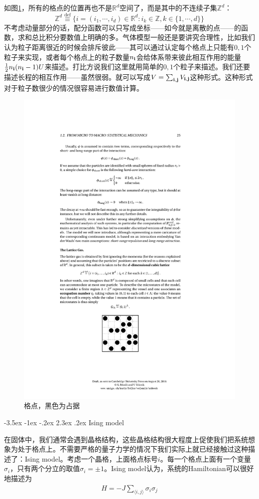 \documentclass[12pt,openany]{book}
\makeatletter
\renewcommand\section{\@startsection {section}{1}{\z@}%
                                   {-3.5ex \@plus -1ex \@minus -.2ex}%
                                   {2.3ex \@plus.2ex}%
                                   {\normalfont\large\bfseries}}
\makeatother
\begin{document}
如图\ref{Fig1}，所有的格点的位置再也不是$\mathbb{R}^d$空间了，而是其中的不连续子集$\mathbb{Z}^d$：
\[\mathbb{Z}^d\overset{\text{def}}{\equiv}\{i=(i_1,\cdots,i_d)\in\mathbb{R}^d: i_k\in\mathbb{Z}, k\in\{1,\cdots,d\}\} \]
不考虑动量部分的话，配分函数可以只写成坐标——如今就是离散的点——的函数，求和总比积分要数值上明确的多。气体模型一般还是要讲究合理性，比如我们认为粒子距离很近的时候会排斥彼此——其可以通过认定每个格点上只能有$0, 1$个粒子来实现，或者每个格点上的粒子数量$n_{\bf i}$会给体系带来彼此相互作用的能量$\frac{1}{2}n_{\bf i}(n_{\bf i}-1)U$来描述。打比方说我们这里就用简单的$0, 1$个粒子来描述。我们还要描述长程的相互作用——虽然很弱。就可以写成$V=\sum_{\bf i, j}V_{\bf i, j}$这种形式。这种形式对于粒子数很少的情况很容易进行数值计算。

\begin{figure}\centering
\includegraphics[width = .3\textwidth]{Fig1.pdf}
\caption{格点，黑色为占据}\label{Fig1}
\end{figure}



\section{Ising model}

在固体中，我们通常会遇到晶格结构，这些晶格结构很大程度上促使我们把系统想象为处于格点上。不需要严格的量子力学的情况下我们实际上就已经接触过这种描述了：Ising model。考虑一个晶格，上面格点标号$i$。每一个格点上面有一个变量$\sigma_i$，只有两个分立的取值$\sigma_i=\pm1$。Ising model认为，系统的Hamiltonian可以很好地描述为
\begin{align}
H=-J\sum_{\langle i,j\rangle}\sigma_i\sigma_j
\end{align}
\end{document}
